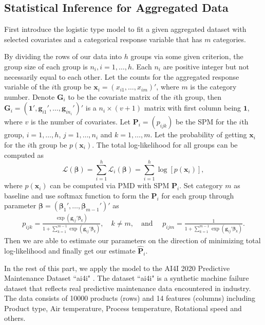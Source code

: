 \documentclass[12pt]{article}
\newcommand{\loglik}{\mathcal{L}}
\newcommand{\onevec}{{\boldsymbol{1}}}
\newcommand{\betavec}{{\boldsymbol{\beta}}}
\newcommand{\Pmat}{\mathbf{P}}
\newcommand{\Gmat}{\mathbf{G}}
\newcommand{\PMD}{\textrm{PMD}}
\newcommand{\wh}{\widehat}
\newcommand{\xvec}{\boldsymbol{x}}
\newcommand{\gvec}{\boldsymbol{g}}
\begin{document}
\subsection{Statistical Inference for Aggregated Data}\label{sec:model.est.inf}	
First introduce the logistic type model to fit a given aggregated dataset with selected covariates and a categorical response variable that has $m$ categories.

By dividing the rows of our data into $h$ groups via some given criterion, the group size of each group is $n_i,i=1,\dots,h$. Each $n_i$ are positive integer but not necessarily equal to each other. Let the counts for the aggregated response variable of the $i$th group be
$\xvec_i = (x_{i1}, \dots,x_{im})'$, where $m$ is the category number. Denote $\Gmat_i$ to be the covariate matrix of the $i$th group, then $\Gmat_i = (\onevec', \gvec_{i 1}',\dots,\gvec_{i n_i}')'$ is a $n_i \times (v+1)$ matrix with first column being $\onevec$, where $v$ is the number of covariates. Let $\Pmat_i = (p_{ijk})$ be the SPM for the $i$th group, $i = 1, \dots, h$, $j = 1,\dots ,n_i$ and $k = 1,\dots, m$. Let the probability of getting $\xvec_i$ for the $i$th group be $p(\xvec_i)$. The total log-likelihood for all groups can be computed as
\begin{equation*}
\loglik(\betavec) = \sum_{i=1}^{h}\loglik_i(\betavec) = \sum_{i=1}^{h}\log[p(\xvec_i)],
\end{equation*}
where $p(\xvec_i)$ can be computed via $\PMD$ with SPM $\Pmat_i$. Set category $m$ as baseline and use softmax function to form the $\Pmat_i$ for each group through parameter $\betavec = (\betavec_1', \dots, \betavec_{m-1}')'$ as
\begin{align*}
    p_{i j k} = \frac{\exp{\left(\gvec_{ij}' \betavec_{k}\right)}}{1 + \sum_{k=1}^{m-1}\exp{\left( \gvec_{ij}' \betavec_{k} \right)}},
    \quad k \neq m, \quad \text{and } \quad
    p_{i j m} = \frac{1}{1 + \sum_{k=1}^{m-1}\exp{\left( \gvec_{ij}' \betavec_{k} \right)}}.
\end{align*}
Then we are able to estimate our parameters on the direction of minimizing total log-likelihood and finally get our estimate $\wh{\Pmat}_i$.

In the rest of this part, we apply the model to the
AI4I 2020 Predictive Maintenance Dataset ``ai4i"  \cite{Dua:2019}. The dataset ``ai4i" is a synthetic machine failure dataset that reflects real predictive maintenance data encountered in industry. The data consists of 10000 products (rows) and 14 features (columns) including Product type, Air temperature, Process temperature, Rotational speed and others.
\end{document}
